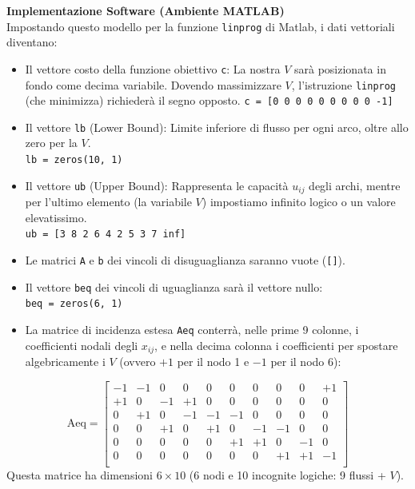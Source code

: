 \documentclass[12pt, a4paper]{article}
\begin{document}
	\textbf{Implementazione Software (Ambiente MATLAB)}\\
	Impostando questo modello per la funzione \texttt{linprog} di Matlab, i dati vettoriali diventano:
	\begin{itemize}
		\item Il vettore costo della funzione obiettivo \texttt{c}: La nostra $V$ sarà posizionata in fondo come decima variabile. Dovendo massimizzare $V$, l'istruzione \texttt{linprog} (che minimizza) richiederà il segno opposto.
		\texttt{c = [0 0 0 0 0 0 0 0 0 -1]}
		\item Il vettore \texttt{lb} (Lower Bound): Limite inferiore di flusso per ogni arco, oltre allo zero per la $V$. \\
		\texttt{lb = zeros(10, 1)}
		\item Il vettore \texttt{ub} (Upper Bound): Rappresenta le capacità $u_{ij}$ degli archi, mentre per l'ultimo elemento (la variabile $V$) impostiamo infinito logico o un valore elevatissimo. \\
		\texttt{ub = [3 8 2 6 4 2 5 3 7 inf]}
		\item Le matrici \texttt{A} e \texttt{b} dei vincoli di disuguaglianza saranno vuote (\texttt{[]}).
		\item Il vettore \texttt{beq} dei vincoli di uguaglianza sarà il vettore nullo: \\
		\texttt{beq = zeros(6, 1)}
		\item La matrice di incidenza estesa \texttt{Aeq} conterrà, nelle prime 9 colonne, i coefficienti nodali degli $x_{ij}$, e nella decima colonna i coefficienti per spostare algebricamente i $V$ (ovvero $+1$ per il nodo 1 e $-1$ per il nodo 6):
	\end{itemize}
	\[
	\text{Aeq} = 
	\begin{bmatrix}
		-1 & -1 &  0 &  0 &  0 &  0 &  0 &  0 &  0 & +1 \\
		+1 &  0 & -1 & +1 &  0 &  0 &  0 &  0 &  0 &  0 \\
		0 & +1 &  0 & -1 & -1 & -1 &  0 &  0 &  0 &  0 \\
		0 &  0 & +1 &  0 & +1 &  0 & -1 & -1 &  0 &  0 \\
		0 &  0 &  0 &  0 &  0 & +1 & +1 &  0 & -1 &  0 \\
		0 &  0 &  0 &  0 &  0 &  0 &  0 & +1 & +1 & -1 \\
	\end{bmatrix}
	\]
	Questa matrice ha dimensioni $6 \times 10$ (6 nodi e 10 incognite logiche: 9 flussi + $V$).
	
\end{document}
